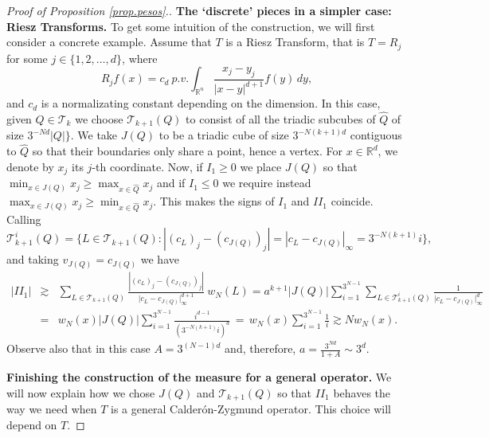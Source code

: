 \documentclass[11pt]{amsart}
\theoremstyle{definition}
\begin{document}
\begin{proof}[Proof of Proposition \ref{prop.pesos}.]
\bigskip

\textbf{The `discrete' pieces in a simpler case: Riesz Transforms.} To get some intuition of the construction, we will first consider a concrete example. Assume that $T$ is a Riesz Transform, that is $T=R_j$ for some $j\in \{1,2,\dots,d\}$, where
\[
R_j f(x)= c_d\ p.v.\! \int_{{\mathbb{R}}^n} \frac{x_j-y_j}{|x-y|^{d+1}}f(y)\,dy,
\]
and $c_d$ is a normalizating constant depending on the dimension. In this case, given $Q\in \mathcal T_k$ we choose $\mathcal T_{k+1}(Q)$ to consist of all the triadic subcubes of $ \widehat{Q}$ of size $3^{-Nd}|Q|\}$. We take $J(Q)$ to be a triadic cube of size $3^{-N(k+1)d}$ contiguous to $\widehat{Q}$ so that their boundaries only share a point, hence a vertex. For $x\in \mathbb R^d$, we denote by $x_j$ its $j$-th coordinate. Now,
if $I_1\geq 0$ we place $J(Q)$ so that $\min_{x\in J(Q)}x_j\geq \max_{x\in \widehat{Q}} x_j$ and if $I_1\leq 0$ we require instead $\max_{x\in J(Q)}x_j\geq \min_{x\in \widehat{Q}} x_j$. This makes the signs of $I_1$ and $I\!I_1$ coincide. Calling 
$$\mathcal T_{k+1}^i(Q) = \{L\in \mathcal T_{k+1}(Q): |(c_L)_j-(c_{J(Q)})_j|=|c_L-c_{J(Q)}|_\infty= 
3^{-N(k+1)}i\},$$ 
and taking $v_{J(Q)}=c_{J(Q)}$ we have
\begin{eqnarray*}
|I\!I_1|&\gtrsim&\sum_{L\in\mathcal T_{k+1}(Q)} \frac{|(c_L)_j-(c_{J(Q)})_j|}{\bigl|c_L-c_{J(Q)}\bigr|_\infty^{d+1}}\  w_N(L) =  a^{k+1}|J(Q)| \sum_{i=1}^{3^{N-1}}\sum_{L\in\mathcal T_{k+1}^i(Q)} \frac{1}{\bigl|c_L-c_{J(Q)}\bigr|_\infty^d} 
\\&=& w_N(x)|J(Q)| \sum_{i=1}^{3^{N-1}} \frac{i^{d-1}}{(3^{-N(k+1)}i)^d} \,=\,w_N(x) \sum_{i=1}^{3^{N-1}} \frac 1i \gtrsim N w_N(x).
\end{eqnarray*}
Observe also that in this case $A=3^{(N-1)d}$ and, therefore, $\displaystyle a=\frac {3^{Nd}}{1+A}\sim 3^d$.

\bigskip

\textbf{Finishing the construction of the measure for a general operator.} We will now explain how we chose $J(Q)$ and $\mathcal T_{k+1}(Q)$ so that $I\!I_1$ behaves the way we need when $T$ is a general Calder\'on-Zygmund operator. This choice will depend on $T$.

\bigskip


\end{proof}
\end{document}
